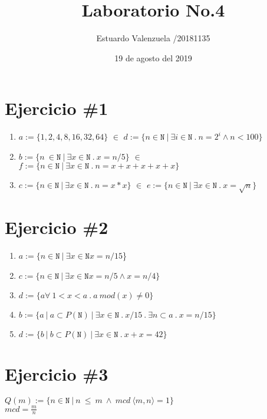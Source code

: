 \documentclass{article}
\author{Estuardo Valenzuela /20181135}
\title{Laboratorio No.4}
\date{19 de agosto del 2019}
\begin{document}
\linespread{1.1}

\maketitle
\section*{Ejercicio \#1 }
\begin{enumerate}

        \item{$a:=\{1,2,4,8,16,32,64\}$} {$\in$} {$d := \{n\in\mathtt{N}\ |\ \exists i\in\mathtt{N}\ .\ n=2^i\wedge n<100 \}$}

        \item{$b:=\{n\ \in \mathtt{N}\ |\ \exists x \in \mathtt{N}\ .\ x=n/5 \}$} {$\in$}  {$f:=\{ n\in\mathtt{N}\ |\ \exists x\in \mathtt{N}\ .\ n=x+x+x+x+x \}$}

        \item{$c:=\{n\in \mathtt{N}\ |\ \exists x\in\mathtt{N}\ .\ n=x*x \}$} {$\in$} {$e:=\{ n\in\mathtt{N}\ |\ \exists x\in \mathtt{N}\ .\ x=\sqrt{n} \}$}

\end{enumerate}
\section*{Ejercicio \#2}
\begin{enumerate}
    \item {$a:=\{n \in \mathtt{N} \ |\ \exists x \in \mathtt{N} x= n/15 $\}}
    \item {$c:= \{ n \in \mathtt{N} \ |\  \exists x \in \mathtt{N} x= n/5 \wedge x = n/4 \} $}
     \item {$d:= \{ a \forall \ 1 < x < a \ . \ a \ mod(x) \neq 0 \} $}
    \item {$b :=\{ a \ |\ a\subset P(\mathtt{N}) \ |\ \exists x \in \mathtt{N} \ .\ x/15 \ .\ \exists n \subset a \ .\ x=n/15\} $}
    \item {$d :=\{ b \ |\ b\subset P(\mathtt{N}) \ |\ \exists x \in \mathtt{N} \ .\ x + x = 42\} $}
\end{enumerate}
\section*{Ejercicio \#3}
$Q(m):= \{ n \in \mathtt{N} \ |\ n \ \leq \  m \ \wedge \ mcd \ \langle m , n \rangle = 1  \}$ \\
 $mcd= \frac{m}{n}$
\end{document}
